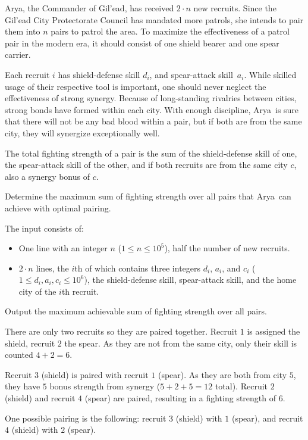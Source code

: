 

\newcommand{\maxn}{10^5}
\newcommand{\maxa}{10^6}
\newcommand{\name}{Arya}

\name, the Commander of Gil'ead, has received $2 \cdot n$ new recruits.
Since the Gil'ead City Protectorate Council has mandated more patrols,
she intends to pair them into $n$ pairs to patrol the area.
To maximize the effectiveness of a patrol pair in the modern era, it should consist of one shield bearer and one spear carrier.

Each recruit $i$ has shield-defense skill $d_i$, and spear-attack skill~$a_i$.
While skilled usage of their respective tool is important, one should never neglect the effectiveness of strong synergy.
Because of long-standing rivalries between cities, strong bonds have formed within each city.
With enough discipline, \name\ is sure that there will not be any bad blood within a pair,
but if both are from the same city, they will synergize exceptionally well.

The total fighting strength of a pair is the sum of the shield-defense skill of one,
the spear-attack skill of the other, and if both recruits are from the same city $c$, also a synergy bonus of $c$.

Determine the maximum sum of fighting strength over all pairs that \name\ can achieve with optimal pairing.

\begin{Input}
    The input consists of:
    \begin{itemize}
        \item One line with an integer $n$ ($1\leq n \leq \maxn$), half the number of new recruits.
        \item $2 \cdot n$ lines, the $i$th of which contains three integers $d_i$, $a_i$, and $c_i$ ($1 \leq d_i, a_i, c_i \leq \maxa$), the shield-defense skill, spear-attack skill, and the home city of the $i$th recruit.
    \end{itemize}
\end{Input}

\begin{Output}
    Output the maximum achievable sum of fighting strength over all pairs.
\end{Output}

\nextsample
There are only two recruits so they are paired together.
Recruit $1$ is assigned the shield, recruit $2$ the spear.
As they are not from the same city, only their skill is counted $4 + 2 = 6$.

\nextsample
Recruit $3$ (shield) is paired with recruit $1$ (spear).
As they are both from city $5$, they have $5$ bonus strength from synergy ($5 + 2 + 5 = 12$ total).
Recruit $2$ (shield) and recruit $4$ (spear) are paired, resulting in a fighting strength of $6$.

\nextsample
One possible pairing is the following:
recruit $3$ (shield) with $1$ (spear), and recruit $4$ (shield) with $2$ (spear).
